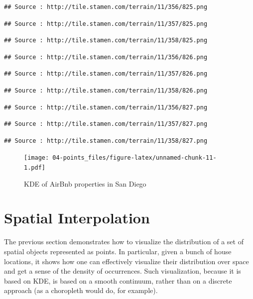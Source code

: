 \documentclass[
]{book}
\begin{document}
\begin{verbatim}
## Source : http://tile.stamen.com/terrain/11/356/825.png
\end{verbatim}

\begin{verbatim}
## Source : http://tile.stamen.com/terrain/11/357/825.png
\end{verbatim}

\begin{verbatim}
## Source : http://tile.stamen.com/terrain/11/358/825.png
\end{verbatim}

\begin{verbatim}
## Source : http://tile.stamen.com/terrain/11/356/826.png
\end{verbatim}

\begin{verbatim}
## Source : http://tile.stamen.com/terrain/11/357/826.png
\end{verbatim}

\begin{verbatim}
## Source : http://tile.stamen.com/terrain/11/358/826.png
\end{verbatim}

\begin{verbatim}
## Source : http://tile.stamen.com/terrain/11/356/827.png
\end{verbatim}

\begin{verbatim}
## Source : http://tile.stamen.com/terrain/11/357/827.png
\end{verbatim}

\begin{verbatim}
## Source : http://tile.stamen.com/terrain/11/358/827.png
\end{verbatim}

\begin{figure}
\centering
\texttt{[image: 04-points\_files/figure-latex/unnamed-chunk-11-1.pdf]}
\caption{\label{fig:unnamed-chunk-11}KDE of AirBnb properties in San Diego}
\end{figure}

\hypertarget{spatial-interpolation}{%
\section{Spatial Interpolation}\label{spatial-interpolation}}

The previous section demonstrates how to visualize the distribution of a set of spatial objects represented as points. In particular, given a bunch of house locations, it shows how one can effectively visualize their distribution over space and get a sense of the density of occurrences. Such visualization, because it is based on KDE, is based on a smooth continuum, rather than on a discrete approach (as a choropleth would do, for example).
\end{document}
